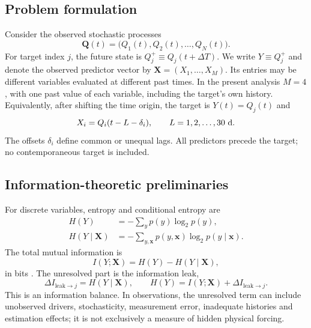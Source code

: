 \documentclass[fleqn,usenatbib]{mnras}
\begin{document}
\subsection{Problem formulation}
Consider the observed stochastic processes
\begin{equation}
\mathbf{Q}(t)=\bigl(Q_1(t),Q_2(t),\ldots,Q_N(t)\bigr).
\end{equation}
For target index $j$, the future state is $Q_j^+\equiv Q_j(t+\Delta T)$. We write $Y\equiv Q_j^+$ and denote the observed predictor vector by $\mathbf{X}=(X_1,\ldots,X_M)$. Its entries may be different variables evaluated at different past times. In the present analysis $M=4$, with one past value of each variable, including the target's own history. Equivalently, after shifting the time origin, the target is $Y(t)=Q_j(t)$ and
\begin{equation}
X_i=Q_i(t-L-\delta_i),\qquad L=1,2,\ldots,30~{\rm d}.
\label{eq:predictors}
\end{equation}
The offsets $\delta_i$ define common or unequal lags. All predictors precede the target; no contemporaneous target is included.

\subsection{Information-theoretic preliminaries}
For discrete variables, entropy and conditional entropy are
\begin{align}
H(Y)&=-\sum_y p(y)\log_2p(y),\\
H(Y\mid\mathbf{X})&=-\sum_{y,\mathbf{x}}p(y,\mathbf{x})\log_2p(y\mid\mathbf{x}).
\end{align}
The total mutual information is
\begin{equation}
I(Y;\mathbf{X})=H(Y)-H(Y\mid\mathbf{X}),
\label{eq:mi_total}
\end{equation}
in bits \citep{Shannon1948,CoverThomas2006}. The unresolved part is the information leak,
\begin{equation}
\Delta I_{\mathrm{leak}\to j}=H(Y\mid\mathbf{X}),\qquad
H(Y)=I(Y;\mathbf{X})+\Delta I_{\mathrm{leak}\to j}.
\label{eq:forward_balance}
\end{equation}
This is an information balance. In observations, the unresolved term can include unobserved drivers, stochasticity, measurement error, inadequate histories and estimation effects; it is not exclusively a measure of hidden physical forcing.
\end{document}

